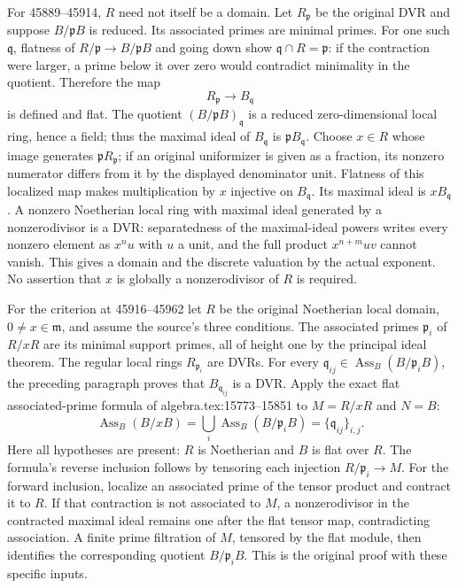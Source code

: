 For 45889--45914, \(R\) need not itself be a domain. Let \(R_{\mathfrak p}\) be the original DVR and suppose \(B/\mathfrak pB\) is reduced. Its associated primes are minimal primes. For one such \(\mathfrak q\), flatness of \(R/\mathfrak p\to B/\mathfrak pB\) and going down show \(\mathfrak q\cap R=\mathfrak p\): if the contraction were larger, a prime below it over zero would contradict minimality in the quotient. Therefore the map \[
 R_{\mathfrak p}\longrightarrow B_{\mathfrak q}
\] is defined and flat. The quotient \((B/\mathfrak pB)_{\mathfrak q}\) is a reduced zero-dimensional local ring, hence a field; thus the maximal ideal of \(B_{\mathfrak q}\) is \(\mathfrak pB_{\mathfrak q}\). Choose \(x\in R\) whose image generates \(\mathfrak pR_{\mathfrak p}\); if an original uniformizer is given as a fraction, its nonzero numerator differs from it by the displayed denominator unit. Flatness of this localized map makes multiplication by \(x\) injective on \(B_{\mathfrak q}\). Its maximal ideal is \(xB_{\mathfrak q}\). A nonzero Noetherian local ring with maximal ideal generated by a nonzerodivisor is a DVR: separatedness of the maximal-ideal powers writes every nonzero element as \(x^n u\) with \(u\) a unit, and the full product \(x^{n+m}uv\) cannot vanish. This gives a domain and the discrete valuation by the actual exponent. No assertion that \(x\) is globally a nonzerodivisor of \(R\) is required.

For the criterion at 45916--45962 let \(R\) be the original Noetherian local domain, \(0\ne x\in\mathfrak m\), and assume the source's three conditions. The associated primes \(\mathfrak p_i\) of \(R/xR\) are its minimal support primes, all of height one by the principal ideal theorem. The regular local rings \(R_{\mathfrak p_i}\) are DVRs. For every \(\mathfrak q_{ij}\in\operatorname{Ass}_B(B/\mathfrak p_iB)\), the preceding paragraph proves that \(B_{\mathfrak q_{ij}}\) is a DVR. Apply the exact flat associated-prime formula of algebra.tex:15773--15851 to \(M=R/xR\) and \(N=B\): \[
 \operatorname{Ass}_B(B/xB)
 =\bigcup_i\operatorname{Ass}_B(B/\mathfrak p_iB)
 =\{\mathfrak q_{ij}\}_{i,j}.
\] Here all hypotheses are present: \(R\) is Noetherian and \(B\) is flat over \(R\). The formula's reverse inclusion follows by tensoring each injection \(R/\mathfrak p_i\to M\). For the forward inclusion, localize an associated prime of the tensor product and contract it to \(R\). If that contraction is not associated to \(M\), a nonzerodivisor in the contracted maximal ideal remains one after the flat tensor map, contradicting association. A finite prime filtration of \(M\), tensored by the flat module, then identifies the corresponding quotient \(B/\mathfrak p_iB\). This is the original proof with these specific inputs.

